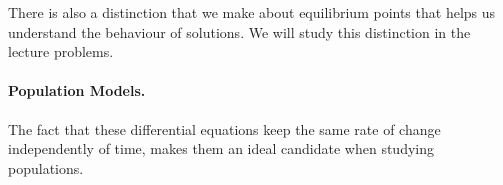 There is also a distinction that we make about equilibrium points that helps us understand the behaviour of solutions. We will study this distinction in the lecture problems.







\paragraph{\color{cyan}Population Models.} The fact that these differential equations keep the same rate of change independently of time, makes them an ideal candidate when studying populations.

%
%
%
%
%
%
%
%
%
%
%
%
%
%
%
